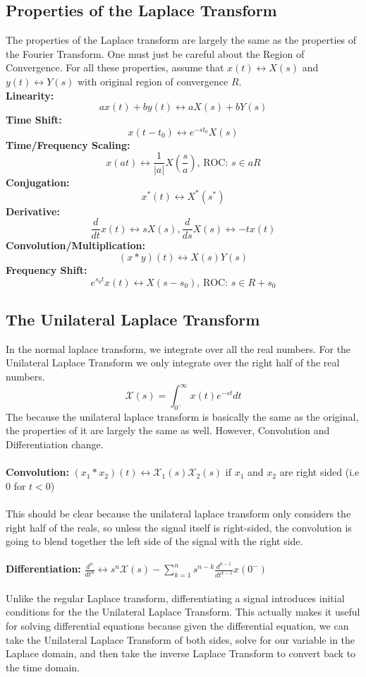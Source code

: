 \documentclass{article}
\begin{document}
\subsection{Properties of the Laplace Transform}
The properties of the Laplace transform are largely the same as the properties of the Fourier Transform. One must just be careful about the Region of Convergence.
For all these properties, assume that $x(t) \leftrightarrow X(s)$ and $y(t) \leftrightarrow Y(s)$ with original region of convergence $R$.\\
\textbf{Linearity: } 
$$ax(t) + by(t) \leftrightarrow aX(s) + bY(s)$$
\textbf{Time Shift: }
$$x(t-t_0) \leftrightarrow e^{-s t_0}X(s)$$
\textbf{Time/Frequency Scaling: }
$$x(at) \leftrightarrow \frac{1}{|a|}X(\frac{s}{a})\text{, ROC: }s\in aR$$
\textbf{Conjugation: } 
$$x^*(t) \leftrightarrow X^*(s^*)$$
\textbf{Derivative: } 
$$\frac{d}{dt}x(t) \leftrightarrow s X(s), \frac{d}{ds}X(s) \leftrightarrow -t x(t)$$
\textbf{Convolution/Multiplication: } 
$$(x*y)(t) \leftrightarrow X(s)Y(s)$$
\textbf{Frequency Shift: } 
$$e^{s_0 t}x(t) \leftrightarrow X(s - s_0)\text{, ROC: }s\in R+s_0$$
\subsection{The Unilateral Laplace Transform}
In the normal laplace transform, we integrate over all the real numbers. For the Unilateral Laplace Transform
we only integrate over the right half of the real numbers.
$$\mathcal{X}(s)=\int_{0^-}^{\infty}{x(t)e^{-st}dt}$$
The because the unilateral laplace transform is basically the same as the original, the properties of it are largely the same as well.
However, Convolution and Differentiation change.\\\\
\textbf{Convolution:} $(x_1*x_2)(t) \leftrightarrow \mathcal{X}_1(s)\mathcal{X}_2(s)$ if $x_1$ and $x_2$ are right sided (i.e 0 for $t<0$)\\\\
This should be clear because the unilateral laplace transform only considers the right half of the reals, so unless the signal itself is right-sided,
the convolution is going to blend together the left side of the signal with the right side.\\\\
\textbf{Differentiation:} $\frac{d^n}{dt^n}\leftrightarrow s^n\mathcal{X}(s)-\sum_{k=1}^{n}{s^{n-k}\frac{d^{k-1}}{dt^{k-1}}x(0^-)}$\\\\
Unlike the regular Laplace transform, differentiating a signal introduces initial conditions for the the Unilateral Laplace Transform. This actually makes it useful
for solving differential equations because given the differential equation, we can take the Unilateral Laplace Transform of both sides, solve for our variable in the Laplace domain,
and then take the inverse Laplace Transform to convert back to the time domain.
\end{document}
